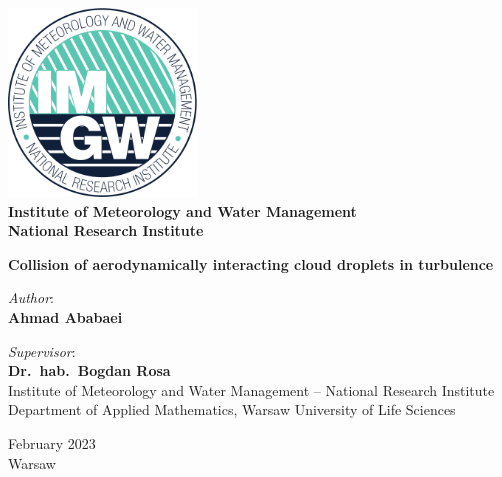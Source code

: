 \documentclass[../thesis.tex]{subfiles}
\begin{document}
\begin{titlepage}
\centering
\includegraphics[width=5cm]{figs/IMGW-PIB_LOGO.pdf}
\\ 
\large\textbf{Institute of Meteorology and Water Management
\\National Research Institute} \\

\vspace{2cm}

\LARGE{\textbf{Collision of aerodynamically interacting cloud droplets in turbulence}} \\

\vspace{2cm}

\normalsize{\textit{Author}:} \\
{\textbf{Ahmad Ababaei}} \\

\vspace{2cm}

\normalsize{\textit{Supervisor}: \\
\textbf{Dr.\ hab.\ Bogdan Rosa} \\
Institute of Meteorology and Water Management -- National Research Institute} \\
Department of Applied Mathematics, Warsaw University of Life Sciences \\

\vfill

\normalsize{February 2023\\Warsaw}

\end{titlepage}
\newpage
\end{document}
